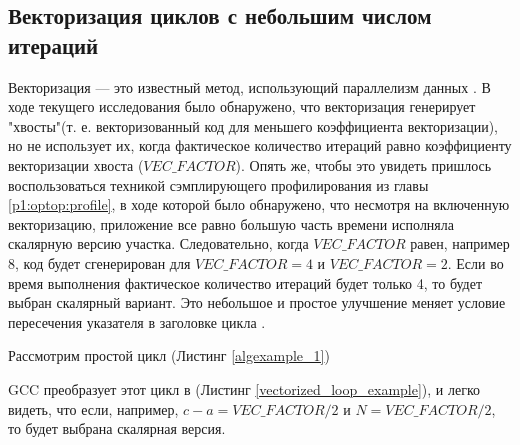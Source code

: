 \subsection {Векторизация циклов с небольшим числом итераций}
Векторизация — это известный метод, использующий параллелизм данных \cite{nuzman2006autovectorization}. В ходе текущего исследования было обнаружено, что векторизация генерирует "хвосты"\phantom{ }(т. е. векторизованный код для меньшего коэффициента векторизации), но не использует их, когда фактическое количество итераций равно коэффициенту векторизации хвоста ($VEC\_FACTOR$). Опять же, чтобы это увидеть пришлось воспользоваться техникой сэмплирующего профилирования из главы \ref{p1:optop:profile}, в ходе которой было обнаружено, что несмотря на включенную векторизацию, приложение все равно большую часть времени исполняла скалярную версию участка. Следовательно, когда $VEC\_FACTOR$ равен, например 8, код будет сгенерирован для $VEC\_FACTOR = 4$ и $VEC\_FACTOR = 2$. Если во время выполнения фактическое количество итераций будет только 4, то будет выбран скалярный вариант. Это небольшое и простое улучшение меняет условие пересечения указателя в заголовке цикла \cite{E240105}.

Рассмотрим простой цикл (Листинг \ref{algexample_1})

GCC преобразует этот цикл в (Листинг \ref{vectorized_loop_example}), и легко видеть, что если, например, $c-a = VEC\_FACTOR/2$ и $N = VEC\_FACTOR/2$, то будет выбрана скалярная версия.

